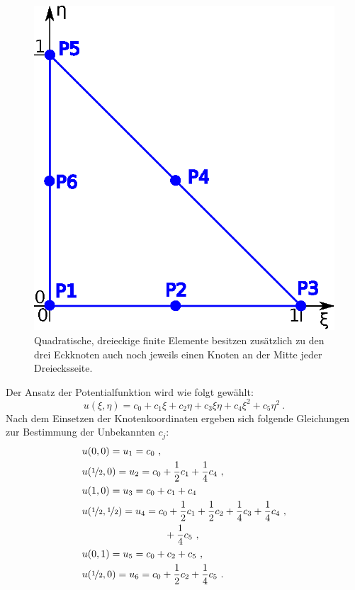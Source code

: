 \begin{figure}[htbp]
	\begin{center}
		\includegraphics[scale=0.65]{pics/quadratic_element.eps}
	\end{center}
	\caption{Quadratische, dreieckige finite Elemente besitzen zusätzlich zu den drei Eckknoten auch noch jeweils einen Knoten an der Mitte jeder Dreiecksseite.}
	\label{fig:quadratic_element}
\end{figure}

Der Ansatz der Potentialfunktion wird wie folgt gewählt:
\begin{equation}
\label{eq:quadratic_triangle_eq}
u(\xi, \eta) = c_0 + c_1 \xi + c_2 \eta + c_3 \xi \eta + c_4 \xi^2 + c_5 \eta^2\ .
\end{equation}	
Nach dem Einsetzen der Knotenkoordinaten ergeben sich folgende Gleichungen zur Bestimmung der Unbekannten $c_j$:
\begin{align}
&u(0,0) = u_1 = c_0 \ ,\\
&u(\nicefrac{1}{2}, 0) = u_2 = c_0 + \frac{1}{2} c_1 + \frac{1}{4} c_4 \ ,\nonumber \\
&u(1, 0) = u_3 = c_0 + c_1 + c_4 \nonumber \\
&u(\nicefrac{1}{2}, \nicefrac{1}{2}) = u_4 = c_0 + \frac{1}{2} c_1 + \frac{1}{2} c_2 + \frac{1}{4} c_3 + \frac{1}{4} c_4  \ ,\nonumber \\ 
&\quad \quad \quad \quad \quad \quad \quad \quad \ +\frac{1}{4} c_5 \ ,\nonumber \\
&u(0, 1) = u_5 = c_0 + c_2 + c_5 \ ,\nonumber \\
&u(\nicefrac{1}{2}, 0) = u_6 = c_0 + \frac{1}{2} c_2 + \frac{1}{4} c_5 \ .\nonumber
\end{align}		

